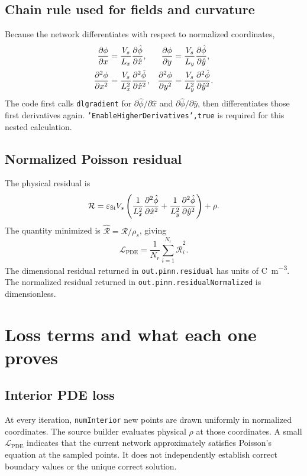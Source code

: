 \documentclass[11pt]{article}
\newcommand{\Lpde}{\ensuremath{\mathcal{L}_{\mathrm{PDE}}}}
\begin{document}
\subsection{Chain rule used for fields and curvature}

Because the network differentiates with respect to normalized coordinates,
\begin{align}
\pdv{\phi}{x}
&=\frac{V_s}{L_x}\pdv{\hat{\phi}}{\hat{x}}, &
\pdv{\phi}{y}
&=\frac{V_s}{L_y}\pdv{\hat{\phi}}{\hat{y}},\\
\pdv[2]{\phi}{x}
&=\frac{V_s}{L_x^2}\pdv[2]{\hat{\phi}}{\hat{x}}, &
\pdv[2]{\phi}{y}
&=\frac{V_s}{L_y^2}\pdv[2]{\hat{\phi}}{\hat{y}}.
\end{align}
The code first calls \texttt{dlgradient} for $\partial\hat{\phi}/\partial\hat{x}$ and $\partial\hat{\phi}/\partial\hat{y}$, then differentiates those first derivatives again. \texttt{'EnableHigherDerivatives',true} is required for this nested calculation.

\subsection{Normalized Poisson residual}

The physical residual is
\begin{equation}
\mathcal{R}=
\varepsilon_{\mathrm{Si}}V_s\left(
\frac{1}{L_x^2}\pdv[2]{\hat{\phi}}{\hat{x}}+
\frac{1}{L_y^2}\pdv[2]{\hat{\phi}}{\hat{y}}
\right)+\rho.
\end{equation}
The quantity minimized is $\hat{\mathcal{R}}=\mathcal{R}/\rho_s$, giving
\begin{equation}
\Lpde=\frac{1}{N_r}\sum_{i=1}^{N_r}
\hat{\mathcal{R}}_i^2.
\end{equation}
The dimensional residual returned in \texttt{out.pinn.residual} has units of \si{C.m^{-3}}. The normalized residual returned in \texttt{out.pinn.residualNormalized} is dimensionless.

\section{Loss terms and what each one proves}

\subsection{Interior PDE loss}

At every iteration, \texttt{numInterior} new points are drawn uniformly in normalized coordinates. The source builder evaluates physical $\rho$ at those coordinates. A small \Lpde{} indicates that the current network approximately satisfies Poisson's equation at the sampled points. It does not independently establish correct boundary values or the unique correct solution.
\end{document}
